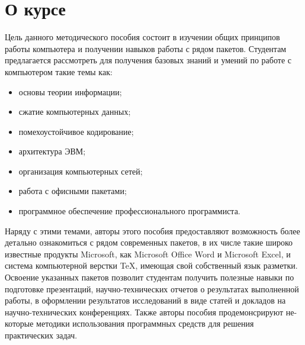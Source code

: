 \section{О курсе}

Цель данного методического пособия состоит в изучении общих принципов работы компьютера и получении навыков работы с рядом пакетов. Студентам предлагается рассмотреть для получения базовых знаний и умений по работе с компьютером такие темы как: 
\begin{itemize}
\item основы теории информации;
\item сжатие компьютерных данных;
\item помехоустойчивое кодирование;
\item архитектура ЭВМ;
\item организация компьютерных сетей;
\item работа с офисными пакетами;
\item программное обеспечение профессионального программиста.
\end{itemize}

Наряду с этими темами, авторы этого пособия предоставляют возможность более детально ознакомиться с рядом современных пакетов, в их числе такие широко известные продукты Microsoft, как Microsoft Office Word и Microsoft Excel, и система компьютерной верстки TeX, имеющая свой собственный язык разметки. Освоение указанных пакетов позволит студентам получить полезные навыки по подготовке презентаций, научно-технических отчетов о результатах выполненной работы, в оформлении результатов исследований в виде статей и докладов на научно-технических конференциях. Также авторы пособия продемонсрируют не-которые методики использования программных средств для решения практических задач.